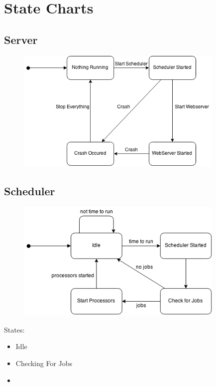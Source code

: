 \section{State Charts}

\subsection{Server}

\begin{figure}[!ht]
\begin{center}
	\includegraphics[width=10cm]{images/statechart_server}
	\caption{}
\end{center}
\end{figure}
\FloatBarrier

\subsection{Scheduler}
\begin{figure}[!ht]
\begin{center}
	\includegraphics[width=10cm]{images/statechart_scheduler}
	\caption{}
\end{center}
\end{figure}
\FloatBarrier

States:
\begin{itemize}
\item Idle
\item Checking For Jobs
\item 
\end{itemize}